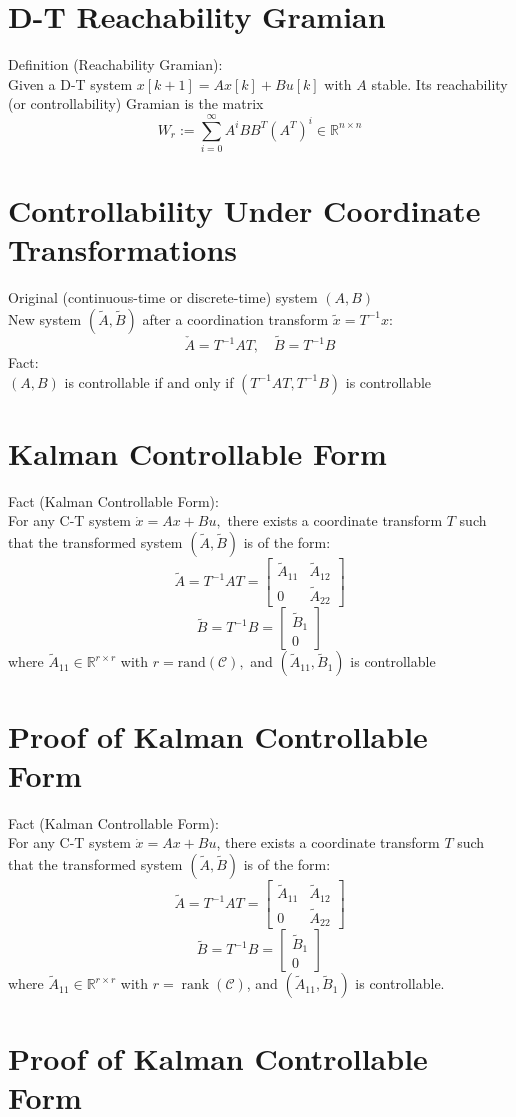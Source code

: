 \documentclass[10pt,a4paper,oneside]{article}
\begin{document}
\section{D-T Reachability Gramian}
Definition (Reachability Gramian):\\
Given a D-T system $x[k+1]=Ax[k]+Bu[k]$ with $A$ stable. Its reachability (or controllability) Gramian is the matrix
\[
W_{r} :=\sum_{i=0}^{\infty} A^{i} B B^{T}\left(A^{T}\right)^{i} \in \mathbb{R}^{n \times n}
\]
\section{Controllability Under Coordinate Transformations}
Original (continuous-time or discrete-time) system $(A,B)$\\
New system $(\tilde{A},\tilde{B})$ after a coordination transform $\tilde{x}=T^{-1}x$:
\[
\check{A}=T^{-1} A T, \quad \tilde{B}=T^{-1} B
\]
Fact:\\
$(A, B)$ is controllable if and only if $\left(T^{-1} A T, T^{-1} B\right)$ is controllable
\section{Kalman Controllable Form}
Fact (Kalman Controllable Form):\\
For any C-T system $\dot{x}=A x+B u,$ there exists a coordinate transform $T$ such that the transformed system $(\tilde{A},\tilde{B})$ is of the form:
\[
\tilde{A}=T^{-1} A T=\left[\begin{array}{ll}{\tilde{A}_{11}} & {\tilde{A}_{12}} \\ {0} & {\tilde{A}_{22}}\end{array}\right]
\]
\[
\tilde{B}=T^{-1} B=\left[\begin{array}{l}{\tilde{B}_{1}} \\ {0}\end{array}\right]
\]
where $\tilde{A}_{11} \in \mathbb{R}^{r \times r}$ with $r=\text{rand}(\mathcal{C}),$ and $\left(\tilde{A}_{11}, \tilde{B}_{1}\right)$ is controllable
\section{Proof of Kalman Controllable Form}
Fact (Kalman Controllable Form):\\
For any C-T system $\dot{x}=Ax+Bu$, there exists a coordinate transform $T$ such that the transformed system $(\tilde{A},\tilde{B})$ is of the form:
\[
\tilde{A}=T^{-1} A T=\left[\begin{array}{ll}{\tilde{A}_{11}} & {\tilde{A}_{12}} \\ {0} & {\tilde{A}_{22}}\end{array}\right]
\]
\[
\tilde{B}=T^{-1} B=\left[\begin{array}{c}{\tilde{B}_{1}} \\ {0}\end{array}\right]
\]
where $\tilde{A}_{11} \in \mathbb{R}^{r \times r}$ with $r=\operatorname{rank}(\mathcal{C})$, and $\left(\tilde{A}_{11}, \tilde{B}_{1}\right)$ is controllable.
\section{Proof of Kalman Controllable Form}
\end{document}
